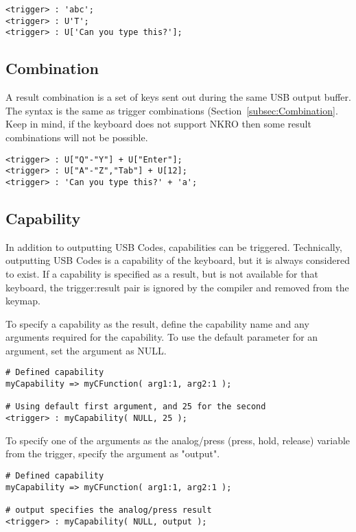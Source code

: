 \documentclass{kiibohd-template}
\begin{document}
\begin{lstlisting}
<trigger> : 'abc';
<trigger> : U'T';
<trigger> : U['Can you type this?'];
\end{lstlisting}


\subsection{Combination}

A result combination is a set of keys sent out during the same USB output buffer.
The syntax is the same as trigger combinations (Section~\ref{subsec:Combination}.
Keep in mind, if the keyboard does not support NKRO then some result combinations will not be possible.

\begin{lstlisting}
<trigger> : U["Q"-"Y"] + U["Enter"];
<trigger> : U["A"-"Z","Tab"] + U[12];
<trigger> : 'Can you type this?' + 'a';
\end{lstlisting}


\subsection{Capability}

In addition to outputting USB Codes, capabilities can be triggered.
Technically, outputting USB Codes is a capability of the keyboard, but it is always considered to exist.
If a capability is specified as a result, but is not available for that keyboard, the trigger:result pair is ignored by the compiler and removed from the keymap.

To specify a capability as the result, define the capability name and any arguments required for the capability.
To use the default parameter for an argument, set the argument as NULL.

\begin{lstlisting}
# Defined capability
myCapability => myCFunction( arg1:1, arg2:1 );

# Using default first argument, and 25 for the second
<trigger> : myCapability( NULL, 25 );
\end{lstlisting}

To specify one of the arguments as the analog/press (press, hold, release) variable from the trigger, specify the argument as "output".

\begin{lstlisting}
# Defined capability
myCapability => myCFunction( arg1:1, arg2:1 );

# output specifies the analog/press result
<trigger> : myCapability( NULL, output );
\end{lstlisting}
\end{document}
